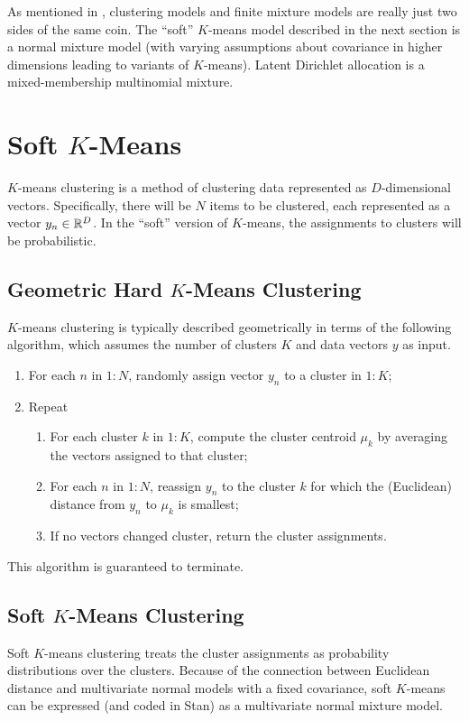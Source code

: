 As mentioned in , clustering models and
finite mixture models are really just two sides of the same coin.  The
``soft'' $K$-means model described in the next section is a normal
mixture model (with varying assumptions about covariance in higher
dimensions leading to variants of $K$-means).  Latent Dirichlet
allocation is a mixed-membership multinomial mixture.

\section{Soft $K$-Means}

$K$-means clustering is a method of clustering data represented as
$D$-dimensional vectors.  Specifically, there will be $N$ items to be
clustered, each represented as a vector $y_n \in \mathbb{R}^D$.  In the
``soft'' version of $K$-means, the assignments to clusters will be
probabilistic.

\subsection{Geometric Hard  $K$-Means Clustering}

$K$-means clustering is typically described geometrically in terms of
the following algorithm, which assumes the number of clusters $K$ and
data vectors $y$ as input.
%
\begin{enumerate}
\item For each $n$ in $1:N$, randomly assign vector $y_n$ to a cluster in $1{:}K$;
\item Repeat
\begin{enumerate}
\item For each cluster $k$ in $1{:}K$, compute the cluster centroid $\mu_k$  by averaging the
  vectors assigned to that cluster;
\item For each $n$ in $1:N$, reassign $y_n$ to the cluster $k$
  for which the (Euclidean) distance from $y_n$ to $\mu_k$ is smallest;
\item If no vectors changed cluster, return the cluster assignments.
\end{enumerate}
\end{enumerate}
%
This algorithm is guaranteed to terminate.

\subsection{Soft $K$-Means Clustering}

Soft $K$-means clustering treats the cluster assignments as
probability distributions over the clusters.  Because of the
connection between Euclidean distance and multivariate normal models
with a fixed covariance, soft $K$-means can be expressed (and coded in
Stan) as a multivariate normal mixture model.

